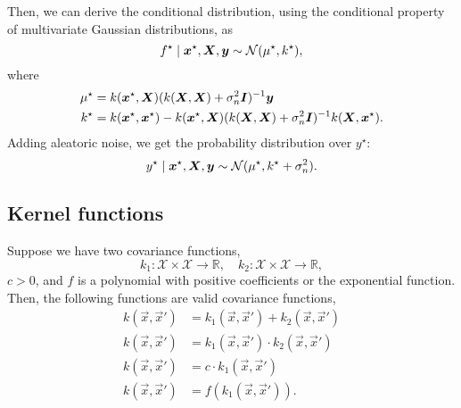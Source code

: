 Then, we can derive the conditional distribution, using the conditional
property of multivariate Gaussian distributions, as \[
  f^\star \mid \bm{x}^\star, \bm{X}, \bm{y} \sim \mathcal{N}(\mu^\star,k^\star),
\]
where
\begin{align*}
  \mu^\star &= k(\bm{x}^\star, \bm{X}) (k(\bm{X}, \bm{X})+\sigma_n^2\bm{I})^{-1} \bm{y} \\
  k^\star &= k(\bm{x}^\star,\bm{x}^\star) - k(\bm{x}^\star,\bm{X}) (k(\bm{X},\bm{X})+\sigma_n^2\bm{I})^{-1} k(\bm{X},\bm{x}^\star).
\end{align*}
Adding aleatoric noise, we get the probability distribution over $y^\star$: \[
  y^\star\mid\bm{x}^\star,\bm{X},\bm{y}\sim\mathcal{N}(\mu^\star,k^\star+\sigma_n^2).
\]


\subsection{Kernel functions}

Suppose we have two covariance functions, \[
  k_1 : \mathcal{X} \times \mathcal{X} \to \mathbb{R}, \hspace{1em} k_2 : \mathcal{X} \times \mathcal{X} \to \mathbb{R},
\]
$c>0$, and $f$ is a polynomial with positive coefficients or the exponential
function. Then, the following functions are valid covariance functions,
\begin{align*}
  k(\vec{x},\vec{x}') &= k_1(\vec{x},\vec{x}')+k_2(\vec{x},\vec{x}') \\
  k(\vec{x},\vec{x}') &= k_1(\vec{x},\vec{x}')\cdot k_2(\vec{x},\vec{x}') \\
  k(\vec{x},\vec{x}') &= c\cdot k_1(\vec{x},\vec{x}') \\
  k(\vec{x},\vec{x}') &= f(k_1(\vec{x},\vec{x}')).
\end{align*}

